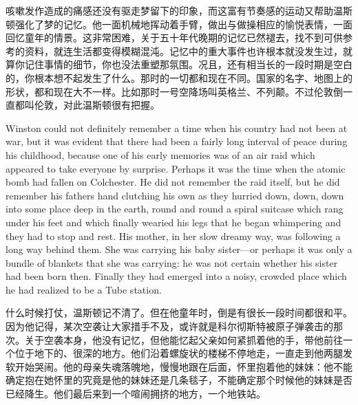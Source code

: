 \begin{paracol}{2}
\switchcolumn

咳嗽发作造成的痛感还没有驱走梦留下的印象，而这富有节奏感的运动又帮助温斯顿强化了梦的记忆。他一面机械地挥动着手臂，做出与做操相应的愉悦表情，一面回忆童年的情景。这非常困难，关于五十年代晚期的记忆已然褪去，找不到可供参考的资料，就连生活都变得模糊混沌。记忆中的重大事件也许根本就没发生过，就算你记住事情的细节，你也没法重塑那氛围。况且，还有相当长的一段时期是空白的，你根本想不起发生了什么。那时的一切都和现在不同。国家的名字、地图上的形状，都和现在大不一样。比如那时一号空降场叫英格兰、不列颠。不过伦敦倒一直都叫伦敦，对此温斯顿很有把握。

\switchcolumn*

Winston could not definitely remember a time when his country had not
been at war, but it was evident that there had been a fairly long
interval of peace during his childhood, because one of his early
memories was of an air raid which appeared to take everyone by surprise.
Perhaps it was the time when the atomic bomb had fallen on Colchester.
He did not remember the raid itself, but he did remember his
father\textquotesingle s hand clutching his own as they hurried down,
down, down into some place deep in the earth, round and round a spiral
suitcase which rang under his feet and which finally wearied his legs
that he began whimpering and they had to stop and rest. His mother, in
her slow dreamy way, was following a long way behind them. She was
carrying his baby sister---or perhaps it was only a bundle of blankets
that she was carrying: he was not certain whether his sister had been
born then. Finally they had emerged into a noisy, crowded place which he
had realized to be a Tube station.

\switchcolumn

什么时候打仗，温斯顿记不清了。但在他童年时，倒是有很长一段时间都很和平。因为他记得，某次空袭让大家措手不及，或许就是科尔彻斯特被原子弹袭击的那次。关于空袭本身，他没有记忆，但他能忆起父亲如何紧抓着他的手，带他前往一个位于地下的、很深的地方。他们沿着螺旋状的楼梯不停地走，一直走到他两腿发软开始哭闹。他的母亲失魂落魄地，慢慢地跟在后面，怀里抱着他的妹妹：他不能确定抱在她怀里的究竟是他的妹妹还是几条毯子，不能确定那个时候他的妹妹是否已经降生。他们最后来到一个喧闹拥挤的地方，一个地铁站。

\switchcolumn*


\end{paracol}
